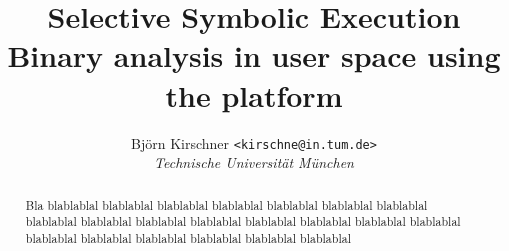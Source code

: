 \documentclass[a4paper,twocolumn]{article}
\title{Selective Symbolic Execution \\ \large Binary analysis in user space using the \sse platform}
\author{Bj\"{o}rn Kirschner \texttt{<{kirschne}{@}{in.tum.de}>}\\
  \emph{Technische Universit\"{a}t M\"{u}nchen}}
\begin{document}
\maketitle

\begin{abstract}
  Bla blablablal blablablal blablablal blablablal blablablal blablablal 
  blablablal blablablal blablablal blablablal blablablal blablablal 
  blablablal blablablal blablablal blablablal blablablal 
  blablablal blablablal blablablal blablablal 
\end{abstract}














\end{document}
